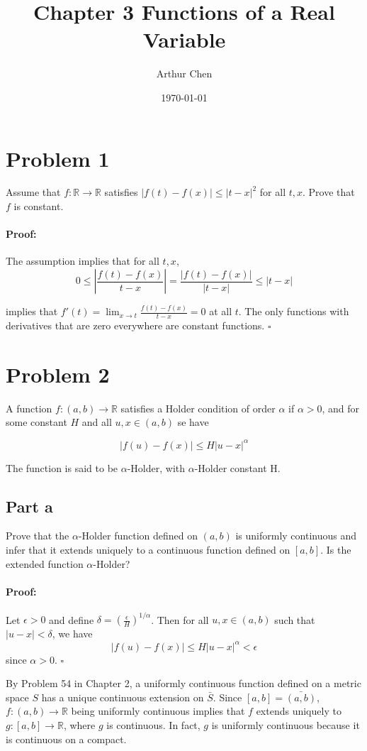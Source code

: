 \documentclass{article}
\author{Arthur Chen}
\title{Chapter 3 Functions of a Real Variable}
\date{\today}
\newenvironment{proof}{\paragraph{Proof:}}{\hfill$\square$}
\newcommand{\R}{\mathbb{R}}
\begin{document}
\maketitle
\section*{Problem 1}
Assume that $f: \R \rightarrow \R$ satisfies $|f(t) - f(x)| \leq |t-x|^2$ for all $t, x$. Prove that $f$ is constant.

\begin{proof}
The assumption implies that for all $t, x$,
\[
0 \leq \left| \frac{f(t)-f(x)}{t-x} \right| = \frac{|f(t)-f(x)|}{|t-x|} \leq |t-x|
\]

implies that $f'(t) = \lim_{x \rightarrow t} \frac{f(t)-f(x)}{t-x} = 0$ at all $t$. The only functions with derivatives that are zero everywhere are constant functions.
\end{proof}

\section*{Problem 2}
A function $f: (a, b) \rightarrow \R$ satisfies a Holder condition of order $\alpha$ if $\alpha > 0$, and for some constant $H$ and all $u, x \in (a, b)$ se have

\[
|f(u) - f(x)| \leq H|u - x|^\alpha
\]

The function is said to be $\alpha$-Holder, with $\alpha$-Holder constant H.

\subsection*{Part a}
Prove that the $\alpha$-Holder function defined on $(a, b)$ is uniformly continuous and infer that it extends uniquely to a continuous function defined on $[a, b]$. Is the extended function $\alpha$-Holder?

\begin{proof}
Let $\epsilon > 0$ and define $\delta = (\frac{\epsilon}{H})^{1/\alpha}$. Then for all $u, x \in (a, b)$ such that $|u-x| < \delta$, we have
\[
|f(u)-f(x)| \leq H|u-x|^\alpha < \epsilon
\]
since $\alpha > 0$.
\end{proof}

By Problem 54 in Chapter 2, a uniformly continuous function defined on a metric space $S$ has a unique continuous extension on $\bar{S}$. Since $[a, b] = \bar{(a, b)}$, $f: (a, b) \rightarrow \R$ being uniformly continuous implies that $f$ extends uniquely to $g: [a, b] \rightarrow \R$, where $g$ is continuous. In fact, $g$ is uniformly continuous because it is continuous on a compact.
\end{document}
